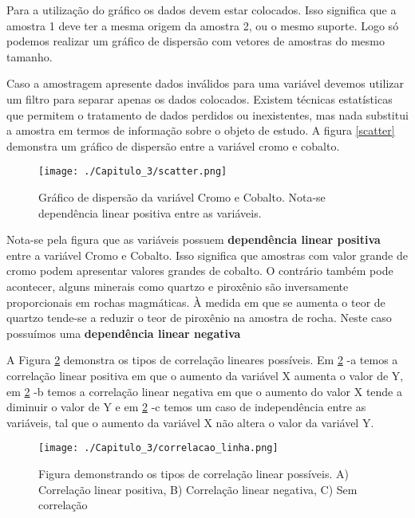 Para a utilização do gráfico os dados devem estar colocados. Isso significa que a amostra 1 deve ter a mesma origem da amostra 2, ou o mesmo suporte. Logo só podemos realizar um gráfico de dispersão com vetores de amostras do mesmo tamanho. 

Caso a amostragem apresente dados inválidos para uma variável devemos utilizar um filtro para separar apenas os dados colocados. Existem técnicas estatísticas que permitem o tratamento de dados perdidos ou inexistentes, mas nada substitui a amostra em termos de informação sobre o objeto de estudo. A figura \eqref{scatter} demonstra um gráfico de dispersão entre a variável cromo e cobalto.
  
\begin{figure}[H]
  	\centering
  	\texttt{[image: ./Capitulo\_3/scatter.png]}	
  	\caption{Gráfico de dispersão da variável Cromo e Cobalto. Nota-se dependência linear positiva entre as variáveis. }
  	\label{scatter}
\end{figure} 
   
Nota-se pela figura que as variáveis possuem \textbf{dependência linear positiva} entre a variável Cromo e Cobalto. Isso significa que amostras com valor grande de cromo podem apresentar valores grandes de cobalto. O contrário também pode acontecer, alguns minerais como quartzo e piroxênio são inversamente proporcionais em rochas magmáticas. À medida em que se aumenta o teor de quartzo tende-se a reduzir o teor de piroxênio na amostra de rocha. Neste caso possuímos uma \textbf{dependência linear negativa} 

A Figura \ref{correlacao_linear} demonstra os tipos de correlação lineares possíveis. Em \ref{correlacao_linear} -a temos a correlação linear positiva em que o aumento da variável X aumenta o valor de Y, em \ref{correlacao_linear} -b temos a correlação linear negativa em que o aumento do valor X tende a diminuir o valor de Y e em \ref{correlacao_linear} -c temos um caso de independência entre as variáveis, tal que o aumento da variável X não altera o valor da variável Y. 

\begin{figure}[H]
	\centering
	\texttt{[image: ./Capitulo\_3/correlacao\_linha.png]}	
	\caption{Figura demonstrando os tipos de correlação linear possíveis. A) Correlação linear positiva, B) Correlação linear negativa, C) Sem correlação }
	\label{correlacao_linear}
\end{figure}



